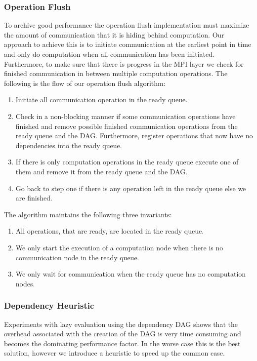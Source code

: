 \documentclass{acm_proc_article-sp}
\begin{document}
\subsubsection{Operation Flush}
To archive good performance the operation flush implementation must maximize the amount of communication that it is hiding behind computation. Our approach to achieve this is to initiate communication at the earliest point in time and only do computation when all communication has been initiated. Furthermore, to make sure that there is progress in the MPI layer we check for finished communication in between multiple computation operations. The following is the flow of our operation flush algorithm:
\begin{enumerate}
\item Initiate all communication operation in the ready queue.
\item Check in a non-blocking manner if some communication operations have finished and remove possible finished communication operations from the ready queue and the DAG. Furthermore, register operations that now have no dependencies into the ready queue.
\item If there is only computation operations in the ready queue execute one of them and remove it from the ready queue and the DAG.
\item Go back to step one if there is any operation left in the ready queue else we are finished.
\end{enumerate}
The algorithm maintains the following three invariants:
\begin{enumerate}
\item All operations, that are ready, are located in the ready queue.
\item We only start the execution of a computation node when there is no communication node in the ready queue.
\item We only wait for communication when the ready queue has no computation nodes.
\end{enumerate}



\subsubsection{Dependency Heuristic}
Experiments with lazy evaluation using the dependency DAG shows that the overhead associated with the creation of the DAG is very time consuming and becomes the dominating performance factor. In the worse case this is the best solution, however we introduce a heuristic to speed up the common case. 
\end{document}
